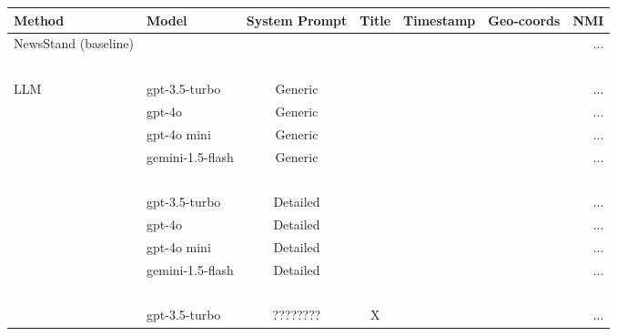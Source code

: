 \begin{table*}[ht!]
    \centering
    \begin{tabular}{l|l|cccc|r}
        \textbf{Method}       & \textbf{Model}    & \textbf{System Prompt} & \textbf{Title} & \textbf{Timestamp} & \textbf{Geo-coords} &\textbf{NMI} \\
        \hline
        NewsStand (baseline)  & ~                 & ~                      & ~              & ~                  & ~                    & ... \\
        ~                     & ~                 & ~                      & ~              & ~                  & ~                    & ~   \\
        LLM                   & gpt-3.5-turbo     & Generic                & ~              & ~                  & ~                    & ... \\
        ~                     & gpt-4o            & Generic                & ~              & ~                  & ~                    & ... \\
        ~                     & gpt-4o mini       & Generic                & ~              & ~                  & ~                    & ... \\
        ~                     & gemini-1.5-flash  & Generic                & ~              & ~                  & ~                    & ... \\
        ~                     & ~                 & ~                      & ~              & ~                  & ~                    & ~   \\
        ~                     & gpt-3.5-turbo     & Detailed               & ~              & ~                  & ~                    & ... \\
        ~                     & gpt-4o            & Detailed               & ~              & ~                  & ~                    & ... \\
        ~                     & gpt-4o mini       & Detailed               & ~              & ~                  & ~                    & ... \\
        ~                     & gemini-1.5-flash  & Detailed               & ~              & ~                  & ~                    & ... \\
        ~                     & ~                 & ~                      & ~              & ~                  & ~                    & ~   \\
        ~                     & gpt-3.5-turbo     & ????????               & X              & ~                  & ~                    & ... \\

\end{tabular}
\end{table*}
